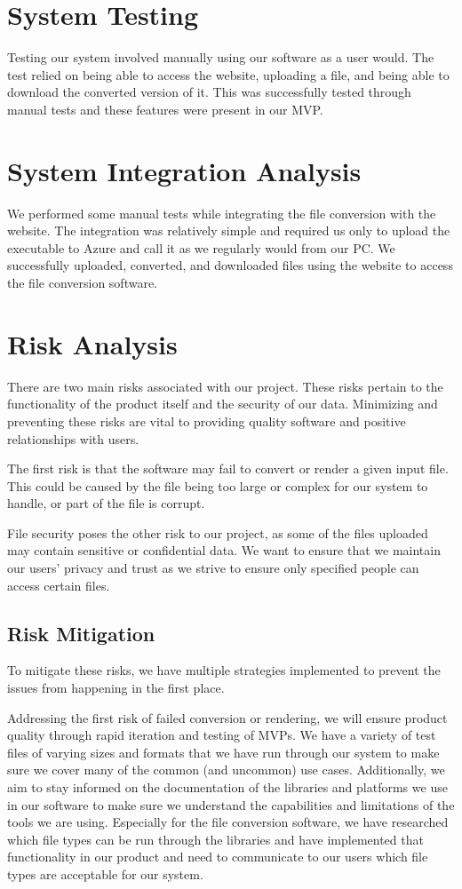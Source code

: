 \section{System Testing}
Testing our system involved manually using our software as a user would.
The test relied on being able to access the website, uploading a file, and being able to download the converted version of it.
This was successfully tested through manual tests and these features were present in our MVP.

\section{System Integration Analysis}
We performed some manual tests while integrating the file conversion with the website.
The integration was relatively simple and required us only to upload the executable to Azure and call it as we regularly would from our PC.
We successfully uploaded, converted, and downloaded files using the website to access the file conversion software.

\section{Risk Analysis}
There are two main risks associated with our project. These risks pertain to the functionality of the product itself and the security of our data.
Minimizing and preventing these risks are vital to providing quality software and positive relationships with users.

The first risk is that the software may fail to convert or render a given input file.
This could be caused by the file being too large or complex for our system to handle, or part of the file is corrupt. 

File security poses the other risk to our project, as some of the files uploaded may contain sensitive or confidential data.
We want to ensure that we maintain our users' privacy and trust as we strive to ensure only specified people can access certain files.
\subsection{Risk Mitigation}
To mitigate these risks, we have multiple strategies implemented to prevent the issues from happening in the first place.

Addressing the first risk of failed conversion or rendering, we will ensure product quality through rapid iteration and testing of MVPs. 
We have a variety of test files of varying sizes and formats that we have run through our system to make sure we cover many of the common (and uncommon) use cases.
Additionally, we aim to stay informed on the documentation of the libraries and platforms we use in our software to make sure we understand the capabilities and limitations of the tools we are using.
Especially for the file conversion software, we have researched which file types can be run through the libraries and have implemented that functionality in our product and need to communicate to our users which file types are acceptable for our system. 

